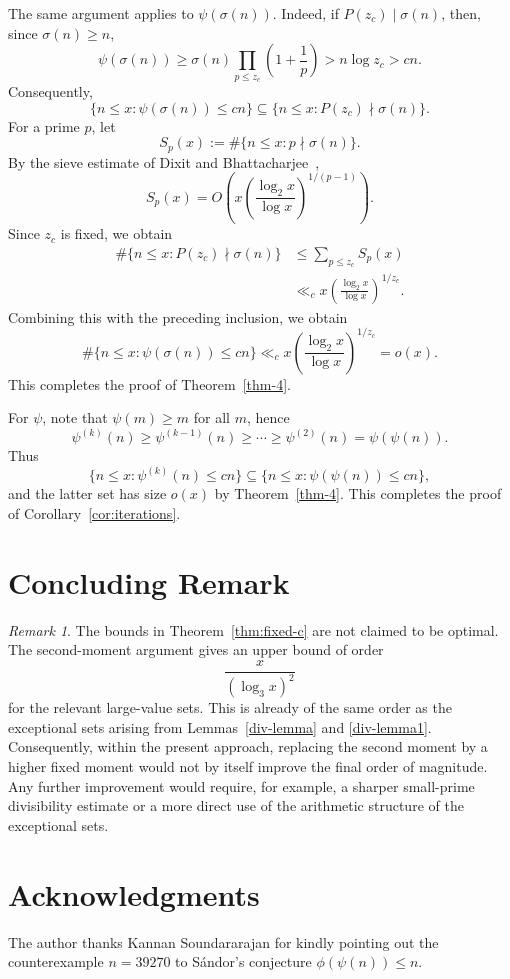 \documentclass{article}
\theoremstyle{remark}
\newtheorem{remark}{Remark}
\begin{document}
The same argument applies to \(\psi(\sigma(n))\). Indeed, if
\(P(z_c)\mid \sigma(n)\), then, since \(\sigma(n)\ge n\),
\[
\psi(\sigma(n))
\geq \sigma(n)\prod_{p\le z_c}\left(1+\frac1p\right)
>
n\log z_c
>
cn.
\]
Consequently,
\[
\{n\le x:\psi(\sigma(n))\le cn\}
\subseteq
\{n\le x:P(z_c)\nmid\sigma(n)\}.
\]
For a prime \(p\), let
\[
S_p(x):=\#\{n\le x:p\nmid\sigma(n)\}.
\]
By the sieve estimate of Dixit and Bhattacharjee~\cite{Bhattacharjee},
\[
S_p(x)
=O\!\left(
x\left(\frac{\log_2 x}{\log x}\right)^{1/(p-1)}
\right).
\]
Since \(z_c\) is fixed, we obtain
\[
\begin{aligned}
\#\{n\le x:P(z_c)\nmid\sigma(n)\}
&\le \sum_{p\le z_c}S_p(x)\\
&\ll_c
x\left(\frac{\log_2 x}{\log x}\right)^{1/z_c}.
\end{aligned}
\]
Combining this with the preceding inclusion, we obtain
\[
\#\{n\le x:\psi(\sigma(n))\le cn\}
\ll_c
x\left(\frac{\log_2 x}{\log x}\right)^{1/z_c}
=o(x).
\]
This completes the proof of Theorem~\ref{thm-4}.

For $\psi$, note that $\psi(m)\ge m$ for all $m$, hence
\[
\psi^{(k)}(n)\ge\psi^{(k-1)}(n)\ge\cdots\ge\psi^{(2)}(n)=\psi(\psi(n)).
\]
Thus 
\[\{n\le x:\psi^{(k)}(n)\le cn\}\subseteq\{n\le x:\psi(\psi(n))\le cn\},\] 
and the latter set has size $o(x)$ by Theorem~\ref{thm-4}. This completes the proof of Corollary~\ref{cor:iterations}.


\section{\bf Concluding Remark}
\medskip

\begin{remark}
The bounds in Theorem~\ref{thm:fixed-c} are not claimed to be optimal.
The second-moment argument gives an upper bound of order
\[
\frac{x}{(\log_3x)^2}
\]
for the relevant large-value sets. This is already of the same order
as the exceptional sets arising from Lemmas~\ref{div-lemma} and
\ref{div-lemma1}. Consequently, within the present approach, replacing
the second moment by a higher fixed moment would not by itself improve
the final order of magnitude. Any further improvement would require,
for example, a sharper small-prime divisibility estimate or a more
direct use of the arithmetic structure of the exceptional sets.
\end{remark}


\section*{Acknowledgments}
The author thanks Kannan Soundararajan for kindly pointing out the
counterexample \(n=39270\) to S\'andor's conjecture
\(\phi(\psi(n))\le n\).
\end{document}
